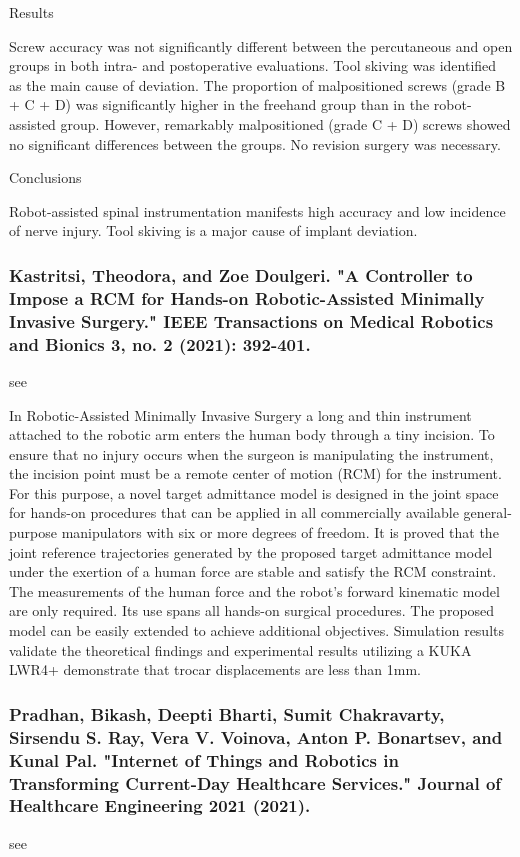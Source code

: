 \documentclass[conference]{IEEEtran}
\begin{document}
Results

Screw accuracy was not significantly different between the percutaneous and open groups in both intra- and postoperative evaluations. Tool skiving was identified as the main cause of deviation. The proportion of malpositioned screws (grade B + C + D) was significantly higher in the freehand group than in the robot-assisted group. However, remarkably malpositioned (grade C + D) screws showed no significant differences between the groups. No revision surgery was necessary.

Conclusions

Robot-assisted spinal instrumentation manifests high accuracy and low incidence of nerve injury. Tool skiving is a major cause of implant deviation.

\medskip
\subsubsection{Kastritsi, Theodora, and Zoe Doulgeri. "A Controller to Impose a RCM for Hands-on Robotic-Assisted Minimally Invasive Surgery." IEEE Transactions on Medical Robotics and Bionics 3, no. 2 (2021): 392-401.}
see \cite{kastritsi2021controller}

In Robotic-Assisted Minimally Invasive Surgery a long and thin instrument attached to the robotic arm enters the human body through a tiny incision. To ensure that no injury occurs when the surgeon is manipulating the instrument, the incision point must be a remote center of motion (RCM) for the instrument. For this purpose, a novel target admittance model is designed in the joint space for hands-on procedures that can be applied in all commercially available general-purpose manipulators with six or more degrees of freedom. It is proved that the joint reference trajectories generated by the proposed target admittance model under the exertion of a human force are stable and satisfy the RCM constraint. The measurements of the human force and the robot’s forward kinematic model are only required. Its use spans all hands-on surgical procedures. The proposed model can be easily extended to achieve additional objectives. Simulation results validate the theoretical findings and experimental results utilizing a KUKA LWR4+ demonstrate that trocar displacements are less than 1mm.

\medskip
\subsubsection{Pradhan, Bikash, Deepti Bharti, Sumit Chakravarty, Sirsendu S. Ray, Vera V. Voinova, Anton P. Bonartsev, and Kunal Pal. "Internet of Things and Robotics in Transforming Current-Day Healthcare Services." Journal of Healthcare Engineering 2021 (2021).}
see \cite{pradhan2021internet}
\end{document}
